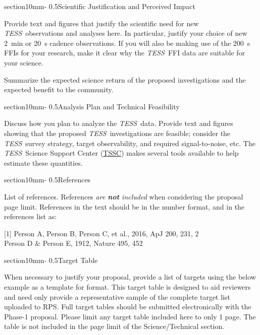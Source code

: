 \documentclass[letterpaper,12pt]{article}
\makeatletter
\renewcommand{\section}{\@startsection%
{section}{1}{0mm}{-\baselineskip}%
{0.5\baselineskip}{\normalfont\Large\bfseries}}%
\newcommand{\tess}{{\it TESS}}
\makeatother
\begin{document}
\section{Scientific Justification and Perceived Impact}

Provide text and figures that justify the scientific need for new \tess\ observations and analyses here. In particular, justify your choice of new 2~min or 20~s cadence observations. If you will also be making use of the 200~s FFIs for your research, make it clear why the \tess\ FFI data are suitable for your science.


Summarize the expected science return of the proposed investigations and the expected benefit to the community.



\section{Analysis Plan and Technical Feasibility}

Discuss how you plan to analyze the \tess\ data. Provide text and figures showing that the proposed \tess\ investigations are feasible; consider the 
\tess\ survey strategy, target observability, and required signal-to-noise, etc. The \tess\ Science 
Support Center (\href{https://heasarc.gsfc.nasa.gov/docs/tess/}{TSSC}) makes several tools available to help estimate these quantities. 


\section{References}

List of references. References {\it are {\bf not} included} when considering the
proposal page limit. References in the text should be in the number format, and in the references list as:

[1] Person A, Person B, Person C, et al., 2016, ApJ 200, 231, 2\\
[2] Person D \& Person E, 1912, Nature 495, 452


\section{Target Table}

When necessary to justify your proposal, provide a list of targets using the below example as a template for format. This target table is designed to aid reviewers and need only provide a representative sample of the complete target list uploaded to RPS. Full target tables should be submitted electronically with the Phase-1 proposal. Please limit any target table included here to only 1 page. The table is not included in the page limit of the Science/Technical section. 
\end{document}
